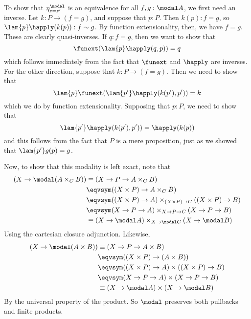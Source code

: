 To show that $\eta^{\modal}_{z = z'}$ is an equivalence for all $f, g : \modal
A$, we first need an inverse.  Let $k : P \to (f = g)$, and suppose that $p :
P$.  Then $k(p) : f = g$, so $\lam{p}\happly(k(p)) : f \sim g$.  By function
extensionality, then, we have $f = g$.  These are clearly quasi-inverses.  If
$q : f = g$, then we want to show that
\[
  \funext(\lam{p}\happly(q, p)) = q
\]
which follows immediately from the fact that $\funext$ and $\happly$ are
inverses.  For the other direction, suppose that $k : P \to (f = g)$.  Then we
need to show that
\[
  \lam{p}\funext(\lam{p'}\happly(k(p'), p')) = k
\]
which we do by function extensionality.  Supposing that $p : P$, we need to
show that
\[
  \lam{p'}\happly(k(p'), p')) = \happly(k(p))
\]
and this follows from the fact that $P$ is a mere proposition, just as we
showed that $\lam{p'}g(p) = g$.


Now, to show that this modality is left exact, note that
\begin{align*}
 (X \to \modal(A \times_{C} B))
 &\equiv
 (X \to P \to A \times_{C} B)
 \\&\eqvsym
 ((X \times P) \to A \times_{C} B)
 \\&\eqvsym
 ((X \times P) \to A) \times_{(X \times P) \to C} ((X \times P) \to B)
 \\&\eqvsym
 (X \to P \to A) \times_{X \to P \to C} (X \to P \to B)
 \\&\equiv
 (X \to \modal A) \times_{X \to \modal C} (X \to \modal B)
\end{align*}
Using the cartesian closure adjunction.  Likewise,
\begin{align*}
  (X \to \modal(A \times B))
  &\equiv
  (X \to P \to A \times B)
  \\&\eqvsym
  ((X \times P) \to (A \times B))
  \\&\eqvsym
  ((X \times P) \to A)
  \times
  ((X \times P) \to B)
  \\&\eqvsym
  (X \to P \to A)
  \times
  (X \to P \to B)
  \\&\equiv
  (X \to \modal A)
  \times
  (X \to \modal B)
\end{align*}
By the universal property of the product.  So $\modal$ preserves both pullbacks
and finite products.


